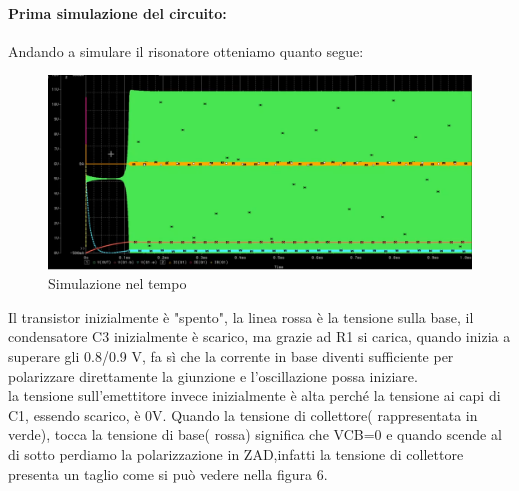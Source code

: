 \documentclass{article}
\begin{document}
\paragraph{Prima simulazione del circuito:}
Andando a simulare il risonatore otteniamo quanto segue:
~\begin{figure}[H]
\includegraphics[scale=0.35]{RisonatoreSimulazione.png}
\centering
\caption{Simulazione nel tempo}
\label{fig:foo}
\end{figure}
Il transistor inizialmente è "spento", la linea rossa è la tensione sulla base, il condensatore C3 inizialmente è scarico, ma grazie ad R1 si carica, quando inizia a superare gli 0.8/0.9 V, fa sì che la corrente in base diventi sufficiente per polarizzare direttamente la giunzione e l'oscillazione possa iniziare.\\la tensione sull'emettitore invece inizialmente è alta perché la tensione ai capi di C1, essendo scarico, è 0V.
Quando la tensione di collettore( rappresentata in verde), tocca la tensione di base( rossa) significa che VCB=0  e quando scende al di sotto perdiamo la polarizzazione in ZAD,infatti  la tensione di collettore presenta un taglio come si può vedere nella figura 6.
\end{document}
